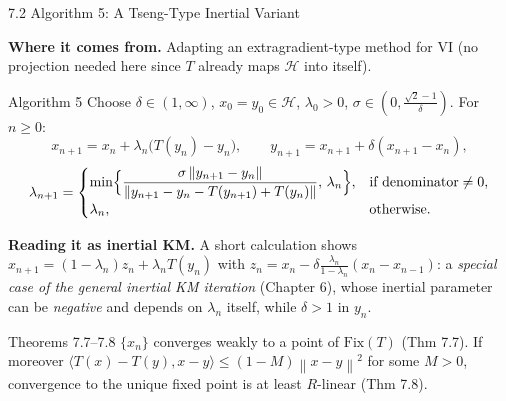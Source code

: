 \documentclass[aspectratio=169,10pt]{beamer}
\newcommand{\mHH}{\mathcal H}
\newcommand{\inner}[2]{\langle #1, #2 \rangle}
\newcommand{\norm}[1]{\left\|#1\right\|}
\newcommand{\Fix}{\mathrm{Fix}}
\begin{document}
\begin{frame}{7.2 Algorithm 5: A Tseng-Type Inertial Variant}

  \textbf{Where it comes from.} Adapting an extragradient-type
  method for VI (no projection needed here since $T$ already maps
  $\mHH$ into itself).

  \begin{block}{Algorithm 5}
    Choose $\delta\in(1,\infty)$, $x_0=y_0\in\mHH$, $\lambda_0>0$,
    $\sigma\in(0,\tfrac{\sqrt2-1}{\delta})$. For $n\ge0$:
    \[
      x_{n+1}=x_n+\lambda_n\bigl(T(y_n)-y_n\bigr), \qquad
      y_{n+1}=x_{n+1}+\delta(x_{n+1}-x_n),
    \]
    \[
      \lambda_{n+1}=
      \begin{cases}
        \min\Bigl\{\dfrac{\sigma\norm{y_{n+1}-y_n}}
                          {\norm{y_{n+1}-y_n-T(y_{n+1})+T(y_n)}},\,
                    \lambda_n\Bigr\}, & \text{if denominator}\neq0,\\
        \lambda_n, & \text{otherwise.}
      \end{cases}
    \]
  \end{block}

  \textbf{Reading it as inertial KM.} A short calculation shows
  $x_{n+1}=(1-\lambda_n)z_n+\lambda_n T(y_n)$ with
  $z_n=x_n-\delta\tfrac{\lambda_n}{1-\lambda_n}(x_n-x_{n-1})$: a
  \emph{special case of the general inertial KM iteration}
  (Chapter 6), whose inertial parameter can be \emph{negative} and
  depends on $\lambda_n$ itself, while $\delta>1$ in $y_n$.

  \begin{alertblock}{Theorems 7.7--7.8}
    $\{x_n\}$ converges weakly to a point of $\Fix(T)$ (Thm 7.7). If
    moreover $\inner{T(x)-T(y)}{x-y}\le(1-M)\norm{x-y}^2$ for some
    $M>0$, convergence to the unique fixed point is at least
    $R$-linear (Thm 7.8).
  \end{alertblock}

\end{frame}
\end{document}

